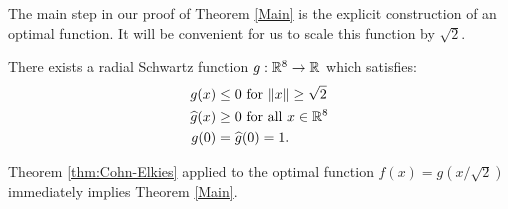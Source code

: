 The main step in our proof of Theorem \ref{Main} is the explicit  construction of an optimal function. It will be convenient for us to scale this function by $\sqrt{2}$.
\begin{theorem}\label{thm:g}
There exists a radial Schwartz function $g:\mathbb{R}^8\to\mathbb{R}$ which satisfies:
\begin{align}
g(x)&\leq 0\mbox{ for } \|x\|\geq \sqrt{2} \label{eqn:g1}\\
\widehat{g}(x)&\geq0\mbox{ for all } x\in\mathbb{R}^8\label{eqn:g2}\\
g(0)&=\widehat{g}(0)=1.\label{eqn:g3}
\end{align}
\end{theorem}
Theorem \ref{thm:Cohn-Elkies} applied to the optimal function $f(x)=g(x/\sqrt{2})$ immediately implies Theorem \ref{Main}.
